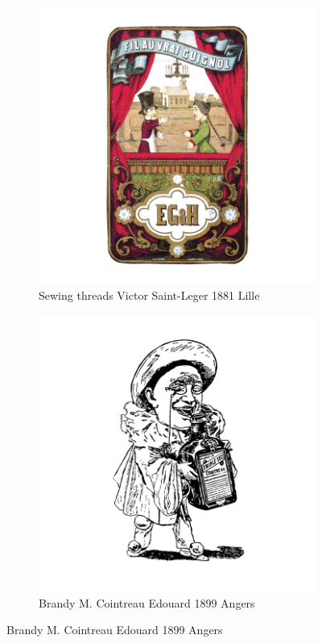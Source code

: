 \begin{figure}[h]
  \centering
  \begin{subfigure}{.45\textwidth}
    \centering
    \includegraphics[width=.5\linewidth]{images/supplement/trademarks/french/5_41}
    \caption[]{Sewing threads Victor Saint-Leger 1881 Lille}
    \label{fig:trademarks:french:5.41}
  \end{subfigure}
  \begin{subfigure}{.45\textwidth}
    \centering
    \includegraphics[width=.5\linewidth]{images/supplement/trademarks/french/5_52}
    \caption[]{Brandy M. Cointreau Edouard 1899 Angers}
    \label{fig:trademarks:french:5.52}
  \end{subfigure}


\end{figure}
